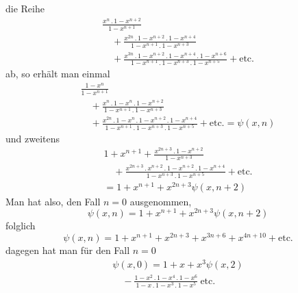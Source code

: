 die Reihe
\[
\begin{gathered}\frac{x^n\,.\,1-x^{n+2}}{1-x^{n+1}}
\\[7pt]\quad{}+\frac{x^{2n}\,.\,1-x^{n+2}\,.\,1-x^{n+4}}{1-x^{n+1}\,.\,1-x^{n+3}}
\\[7pt]\quad{}+\frac{x^{3n}\,.\,1-x^{n+2}\,.\,1-x^{n+4}\,.\,1-x^{n+6}}{1-x^{n+1}\,.\,1-x^{n+3}\,.\,1-x^{n+5}}
+\text{etc.}\end{gathered}
\]
ab, so erhält man einmal
\[
\begin{gathered}\frac{1-x^n}{1-x^{n+1}}
\\[7pt]\quad{}+\frac{x^n\,.\,1-x^n\,.\,1-x^{n+2}}{1-x^{n+1}\,.\,1-x^{n+3}}
\\[7pt]\quad{}+\frac{x^{2n}\,.\,1-x^n\,.\,1-x^{n+2}\,.\,1-x^{n+4}}{1-x^{n+1}\,.\,1-x^{n+3}\,.\,1-x^{n+5}}
+\text{etc.}=\psi(x,n)\end{gathered}
\]
und zweitens
\[
\begin{gathered}
1+x^{n+1}+\frac{x^{2n+3}\,.\,1-x^{n+2}}{1-x^{n+3}}
\\[7pt]\quad{}+\frac{x^{2n+3}\,.\,x^{n+2}\,.\,1-x^{n+2}\,.\,1-x^{n+4}}{1-x^{n+3}\,.\,1-x^{n+5}}+\text{etc.}\\[7pt]
=1+x^{n+1}+x^{2n+3}\psi(x,n+2)
\end{gathered}
\]
Man hat also, den Fall \(n=0\) ausgenommen,
\[
\psi(x,n)=1+x^{n+1}+x^{2n+3}\psi(x,n+2)
\]
folglich
\[
\psi(x,n)=1+x^{n+1}+x^{2n+3}+x^{3n+6}+x^{4n+10}+\text{etc.}
\]
dagegen hat man für den Fall \(n=0\)
\[
\begin{gathered}\psi(x,0)=1+x+x^3\psi(x,2)\\[7pt]\quad{}-\frac{1-x^2\,.\,1-x^4\,.\,1-x^6}{1-x\,.\,1-x^3\,.\,1-x^5}\ \text{etc.}\end{gathered}
\]

